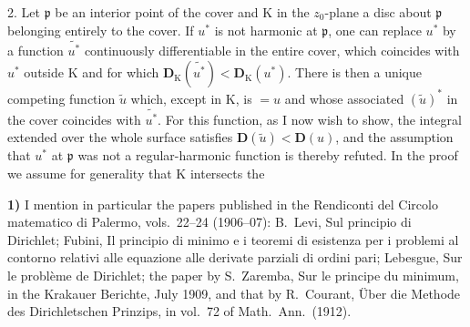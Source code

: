 \documentclass{article}
\begin{document}

2. Let $\mathfrak{p}$ be an interior point of the cover and $\mathrm{K}$ in the $z_0$-plane a disc about $\mathfrak{p}$ belonging entirely to the cover. If $u^*$ is not harmonic at $\mathfrak{p}$, one can replace $u^*$ by a function $\widetilde{u^*}$ continuously differentiable in the entire cover, which coincides with $u^*$ outside $\mathrm{K}$ and for which $\mathbf{D}_{\mathrm{K}}(\widetilde{u^*}) < \mathbf{D}_{\mathrm{K}}(u^*)$. There is then a unique competing function $\tilde{u}$ which, except in $\mathrm{K}$, is $= u$ and whose associated $(\tilde{u})^*$ in the cover coincides with $\widetilde{u^*}$. For this function, as I now wish to show, the integral extended over the whole surface satisfies $\mathbf{D}(\tilde{u}) < \mathbf{D}(u)$, and the assumption that $u^*$ at $\mathfrak{p}$ was not a regular-harmonic function is thereby refuted. In the proof we assume for generality that $\mathrm{K}$ intersects the

\textbf{1)} I mention in particular the papers published in the Rendiconti del Circolo matematico di Palermo, vols.~22--24 (1906--07): B.~Levi, Sul principio di Dirichlet; Fubini, Il principio di minimo e i teoremi di esistenza per i problemi al contorno relativi alle equazione alle derivate parziali di ordini pari; Lebesgue, Sur le problème de Dirichlet; the paper by S.~Zaremba, Sur le principe du minimum, in the Krakauer Berichte, July 1909, and that by R.~Courant, Über die Methode des Dirichletschen Prinzips, in vol.~72 of Math.\ Ann.\ (1912).
\end{document}
